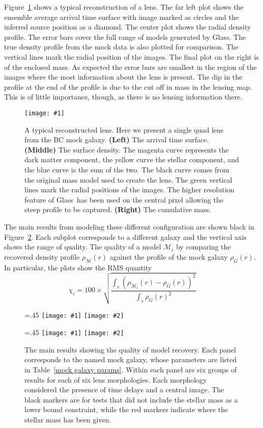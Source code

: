 \documentclass[onecolumn,galley]{mn2e}
\newcommand{\Glass}{{\sc Glass}}
\newcommand{\M}{\ensuremath{\mathscr{M}}}
\newcommand{\tabref}[1] {Table~\ref{#1}}
\newcommand{\figref}[1] {Figure~\ref{#1}}
\newcommand\plotone[1]{%
 \centering
 \leavevmode
 \texttt{[image: \#1]}%
}%
\newcommand\plottwo[2]{{%
 \centering
 \leavevmode
 \columnwidth=.45\columnwidth
 \texttt{[image: \#1]}%
 \hfil
 \texttt{[image: \#2]}%
}}%
\begin{document}
\figref{reconstruction} shows a typical reconstruction of a
lens. The far left plot shows the ensemble average arrival time surface with
image marked as circles and the inferred source position as a diamond. The
center plot shows the radial density profile. The error bars cover the full
range of models generated by \Glass. The true density profile from the mock
data is also plotted for comparison. The vertical lines mark the radial
position of the images. The final plot on the right is of the enclosed mass. As
expected the error bars are smallest in the region of the images where the most
information about the lens is present. The dip in the profile at the end of the
profile is due to the cut off in mass in the lensing map. This is of little
importance, though, as there is no lensing information there.

\begin{figure}
\plotone{BCQuadR1a_TmS.pdf}
\caption{A typical reconstructed lens. Here we present a single quad lens from 
the BC mock galaxy.
\textbf{(Left)}
The arrival time surface. 
\textbf{(Middle)}
The surface density. The magenta curve represents the dark matter component,
the yellow curve the stellar component, and the blue curve is the sum of the two.
The black curve comes from the original mass model used to create the lens.
The green vertical lines mark the radial positions of the images. The higher
resolution feature of \Glass\ has been used on the central pixel allowing the
steep profile to be captured.
\textbf{(Right)}
The cumulative mass.}
\label{reconstruction}
\end{figure}

The main results from modeling these different configuration are shown black in
\figref{main results}. Each subplot corresponds to a different galaxy and
the vertical axis shows the range of quality.  The quality of a
model $\M_i$ by comparing the recovered density profile $\rho_\M(r)$ against
the profile of the mock galaxy $\rho_G(r)$.  In particular, the plots show the
RMS quantity
%
\begin{equation}
  \chi_i = 100 \times \sqrt{\frac{\int_r (\rho_{\M_i}(r) - \rho_G(r))^2}{\int_r \rho_G(r)^2}}
\end{equation}
%

\begin{figure}
\plottwo{AAchi2_profile.pdf}{BBchi2_profile.pdf}

\plottwo{ACchi2_profile.pdf}{BCchi2_profile.pdf}
\caption{The main results showing the quality of model recovery. Each panel corresponds to 
the named mock galaxy, whose parameters are listed in \tabref{mock galaxy params}. Within
each panel are six groups of results for each of six lens morphologies. Each morphology
considered the presence of time delays and a central image. The black markers are for tests
that did not include the stellar mass as a lower bound constraint, while the red markers
indicate where the stellar mass has been given.}
\label{main results}
\end{figure}
\end{document}
